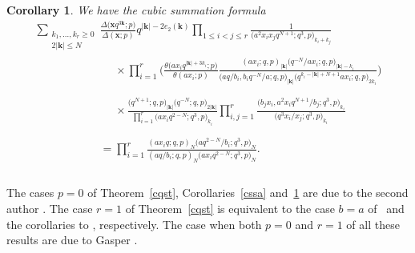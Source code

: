 \documentclass[pdftex]{sigma}%
\numberwithin{equation}{section}
\newtheorem{Corollary}[Theorem]{Corollary}
\def\ta{\theta}
\newcommand\bk{\mathbf k}
\newcommand\bx{\mathbf x}
\begin{document}
\begin{Corollary}\label{cssb}
We have the cubic summation formula
\begin{gather*}
\sum_{\substack{k_1,\dots,k_r\geq 0\\ 2|\bk |\leq N}}
\frac{\Delta\big(\bx q^{3\bk};p\big)}{\Delta(\bx;p)}q^{|\bk|-2e_2(\bk)}
\prod\limits_{1\le i<j\le r}\frac 1{\big(a^2x_ix_jq^{N+1};q^3,p\big) _{k_i+k_j}}
\\ \phantom{\sum_{\substack{k_1,\dots,k_r\geq 0\\ 2|\bk |\leq N}}=}{}
\times
\prod\limits_{i=1}^{r}\bigg(\frac{\ta\big(ax_iq^{|\bk|+3k_i};p\big)}{\ta(ax_i;p)}
\frac {(ax_i;q,p)_{|\bk|} \big(q^{-N}/ax_i;q,p\big)_{|\bk|-k_i}}
{\big(aq/b_i,b_iq^{-N}/a;q,p\big)_{|\bk|}\big(q^{k_i-|\bk|+N+1}ax_i;q,p\big)_{2k_i}}\bigg)
\\ \phantom{\sum_{\substack{k_1,\dots,k_r\geq 0\\ 2|\bk |\leq N}}=}{}
\times
\frac{\big(q^{N+1};q,p\big)_{|\bk|} \big(q^{-N};q,p\big)_{2|\bk|}}
{\prod\limits_{i=1}^{r}\big(ax_iq^{2-N};q^3,p\big)_{k_i}}
\prod\limits_{i,j=1} ^{r}\frac{\big(b_jx_i,a^2x_iq^{N+1}/b_j;q^3,p\big)_{k_i}}
{\big(q^3x_i/x_j;q^3,p\big)_{k_i}}
\\ \phantom{\sum_{\substack{k_1,\dots,k_r\geq 0\\ 2|\bk |\leq N}}}{}
=\prod\limits_{i=1}^{r}\frac
{(ax_iq;q,p)_{N} \big(aq^{2-N}/b_i;q^3,p\big)_{N}}
{(aq/b_i;q,p)_{N} \big(ax_iq^{2-N};q^3,p\big)_{N}}.
\end{gather*}
\end{Corollary}

The cases $p=0$ of Theorem~\ref{cqst}, Corollaries~\ref{cssa} and~\ref{cssb}
are due to the second author \mbox{\cite[Theorems~5.29 and~5.34]{s}}.
The case $r=1$ of Theorem~\ref{cqst} is equivalent to the case $b=a$ of~\cite[Corollary~4.5]{w} and the corollaries to \cite[Corollaries~4.14 and~4.12]{w}, respectively.
The case when
both $p=0$ and $r=1$ of all these results
are due to Gasper \cite{g}.
\end{document}

